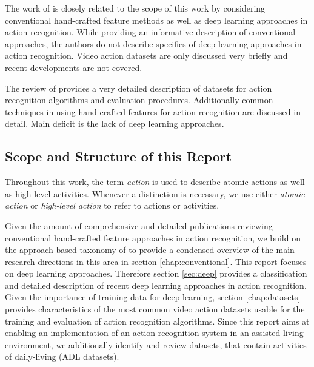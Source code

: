 The work of \textcite{herath_going_2016} is closely related to the scope of this work by considering conventional hand-crafted feature methods as well as deep learning approaches in action recognition.
While providing an informative description of conventional approaches, the authors do not describe specifics of deep learning approaches in action recognition.
Video action datasets are only discussed very briefly and recent developments are not covered.

The review of \textcite{kang_review_2016} provides a very detailed description of datasets for action recognition algorithms and evaluation procedures.
Additionally common techniques in using hand-crafted features for action recognition are discussed in detail.
Main deficit is the lack of deep learning approaches.

\subsection{Scope and Structure of this Report}
Throughout this work, the term \textit{action} is used to describe atomic actions as well as high-level activities.
Whenever a distinction is necessary, we use either \textit{atomic action} or \textit{high-level action} to refer to actions or activities.

Given the amount of comprehensive and detailed publications reviewing conventional hand-crafted feature approaches in action recognition, we build on the approach-based taxonomy of \textcite{aggarwal_human_2011} to provide a condensed overview of the main research directions in this area in section \ref{chap:conventional}.
This report focuses on deep learning approaches.
Therefore section \ref{sec:deep} provides a classification and detailed description of recent deep learning approaches in action recognition.
Given the importance of training data for deep learning, section \ref{chap:datasets} provides characteristics of the most common video action datasets usable for the training and evaluation of action recognition algorithms.
Since this report aims at enabling an implementation of an action recognition system in an assisted living environment, we additionally identify and review datasets, that contain activities of daily-living (ADL datasets).


